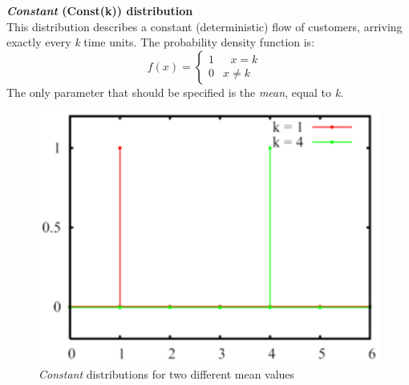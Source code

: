 \textbf{\emph{Constant} (Const(k)) distribution}\\
 This distribution
describes a constant (deterministic) flow of customers, arriving
exactly every \emph{k} time units. The probability density function is:
\[ f(x) = \left\{ \begin{array} {ll}
          1   &   \mbox{ $x=k$ } \\
          0   &   \mbox{$x\neq{k}$}
                 \end {array}
\right.   \] The only parameter that should be specified is the
\emph{mean}, equal to \emph{k}.
\begin{figure}[htb]
    \begin{center}
        \includegraphics[scale=.5]{img/jsimg/4.2.eps}
    \end{center}
    \caption{\emph{Constant} distributions for two different mean values}
    \label{fig:constk}
\end{figure}\\

